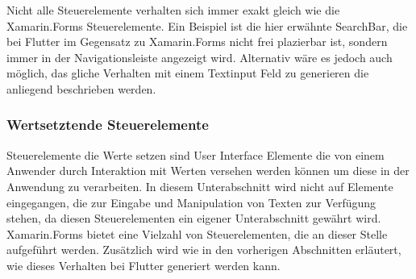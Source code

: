 Nicht alle Steuerelemente verhalten sich immer exakt gleich wie die Xamarin.Forms Steuerelemente. Ein Beispiel ist die hier erwähnte SearchBar, die bei Flutter im Gegensatz zu Xamarin.Forms nicht frei plazierbar ist, sondern immer in der Navigationsleiste angezeigt wird.  Alternativ wäre es jedoch auch möglich,  das gliche Verhalten mit einem Textinput Feld zu generieren die anliegend beschrieben werden. 


\subsubsection{Wertsetztende Steuerelemente}

Steuerelemente die Werte setzen sind User Interface Elemente die von einem Anwender durch Interaktion mit Werten versehen werden können um diese in der Anwendung zu verarbeiten.  In diesem Unterabschnitt wird nicht auf Elemente eingegangen,  die zur Eingabe und Manipulation von Texten zur Verfügung stehen, da diesen Steuerelementen ein eigener Unterabschnitt gewährt wird.  Xamarin.Forms bietet eine Vielzahl von Steuerelementen, die an dieser Stelle aufgeführt werden. Zusätzlich wird wie in den vorherigen Abschnitten erläutert, wie dieses Verhalten bei Flutter generiert werden kann. 
